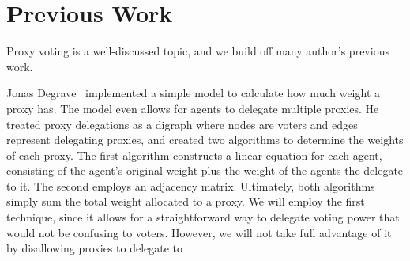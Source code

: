 \section{Previous Work}\label{sec:previous-work}
Proxy voting is a well-discussed topic, and we build off many author's previous work.

Jonas Degrave~\cite{Degrave2014} implemented a simple model to calculate how much
weight a proxy has.
The model even allows for agents to delegate multiple proxies.
He treated proxy delegations as a digraph where nodes are voters and edges represent
delegating proxies, and created two algorithms to determine the weights of each proxy.
The first algorithm constructs a linear equation for each agent, consisting of the
agent's original weight plus the weight of the agents the delegate to it.
The second employs an adjacency matrix.  
Ultimately, both algorithms simply sum the total weight allocated to a proxy.
We will employ the first technique, since it allows for a straightforward way to
delegate voting power that would not be confusing to voters.
However, we will not take full advantage of it by disallowing proxies to delegate to
